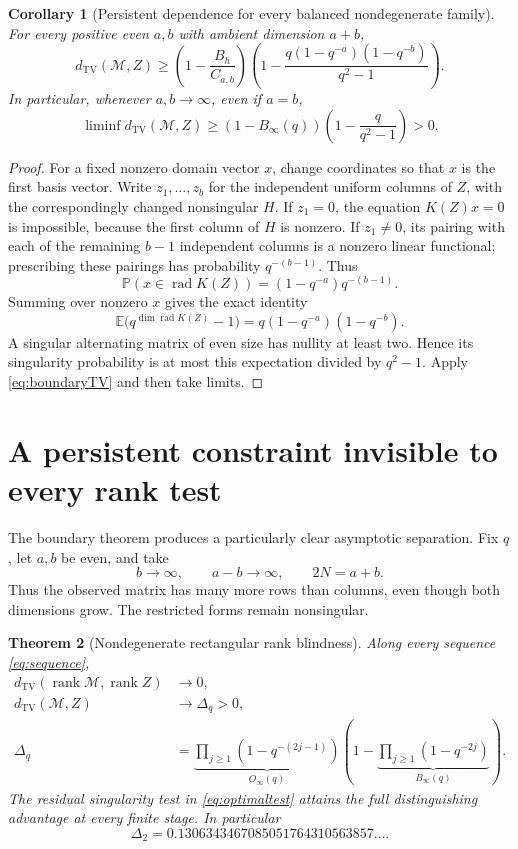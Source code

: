 \documentclass[11pt]{article}
\numberwithin{equation}{section}
\newtheorem{theorem}{Theorem}[section]
\newtheorem{corollary}[theorem]{Corollary}
\theoremstyle{definition}
\theoremstyle{remark}
\newcommand{\Prob}{\mathbb P}
\newcommand{\E}{\mathbb E}
\newcommand{\TV}{d_{\mathrm{TV}}}
\newcommand{\rank}{\operatorname{rank}}
\newcommand{\rad}{\operatorname{rad}}
\newcommand{\Binf}{B_\infty(q)}
\newcommand{\Oinf}{O_\infty(q)}
\begin{document}
\begin{corollary}[Persistent dependence for every balanced nondegenerate family]\label{cor:allboundary}
For every positive even $a,b$ with ambient dimension $a+b$,
\begin{equation}\label{eq:uniformlower}
 \TV(\mathcal M,Z)\ge
 \left(1-\frac{B_h}{C_{a,b}}\right)
 \left(1-\frac{q(1-q^{-a})(1-q^{-b})}{q^2-1}\right).
\end{equation}
In particular, whenever $a,b\to\infty$, even if $a=b$,
\[
 \liminf\TV(\mathcal M,Z)\ge
 (1-\Binf)\left(1-\frac{q}{q^2-1}\right)>0.
\]
\end{corollary}
\begin{proof}
For a fixed nonzero domain vector $x$, change coordinates so that $x$ is the first basis vector. Write $z_1,\ldots,z_b$ for the independent uniform columns of $Z$, with the correspondingly changed nonsingular $H$. If $z_1=0$, the equation $K(Z)x=0$ is impossible, because the first column of $H$ is nonzero. If $z_1\ne0$, its pairing with each of the remaining $b-1$ independent columns is a nonzero linear functional; prescribing these pairings has probability $q^{-(b-1)}$. Thus
\[
 \Prob(x\in\rad K(Z))=(1-q^{-a})q^{-(b-1)}.
\]
Summing over nonzero $x$ gives the exact identity
\[
 \E\bigl(q^{\dim\rad K(Z)}-1\bigr)=q(1-q^{-a})(1-q^{-b}).
\]
A singular alternating matrix of even size has nullity at least two. Hence its singularity probability is at most this expectation divided by $q^2-1$. Apply \eqref{eq:boundaryTV} and then take limits.
\end{proof}

\section{A persistent constraint invisible to every rank test}
\label{sec:limit}
The boundary theorem produces a particularly clear asymptotic separation. Fix $q$, let $a,b$ be even, and take
\begin{equation}\label{eq:sequence}
 b\longrightarrow\infty,\qquad a-b\longrightarrow\infty,\qquad 2N=a+b.
\end{equation}
Thus the observed matrix has many more rows than columns, even though both dimensions grow. The restricted forms remain nonsingular.

\begin{theorem}[Nondegenerate rectangular rank blindness]\label{thm:blind}
Along every sequence \eqref{eq:sequence},
\begin{align}
 \TV(\rank\mathcal M,\rank Z)&\longrightarrow0,\label{eq:ranklimit}\\
 \TV(\mathcal M,Z)&\longrightarrow\Delta_q>0,\label{eq:fulllimit}\\
 \Delta_q&=
 \underbrace{\prod_{j\ge1}(1-q^{-(2j-1)})}_{\Oinf}
 \left(1-\underbrace{\prod_{j\ge1}(1-q^{-2j})}_{\Binf}\right).
 \label{eq:Delta}
\end{align}
The residual singularity test in \eqref{eq:optimaltest} attains the full distinguishing advantage at every finite stage. In particular
\[
 \Delta_2=0.1306343467085051764310563857\ldots.
\]
\end{theorem}
\end{document}

